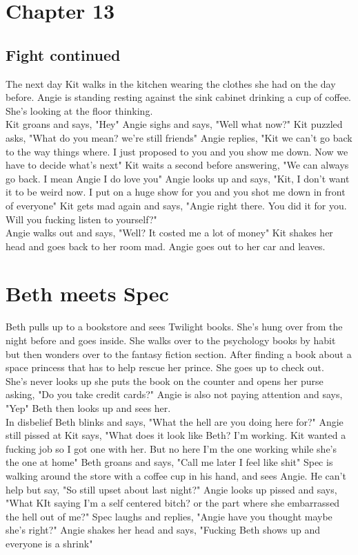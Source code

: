 \documentclass{article}[12px] %
\begin{document}
\section* {Chapter 13}        %
\subsection* {Fight continued}%
The next day Kit walks in the kitchen wearing the clothes she had on the day before. Angie is standing resting against the sink cabinet drinking a cup of coffee. She's looking at the floor thinking.\\

Kit groans and says, "Hey" Angie sighs and says, "Well what now?" Kit puzzled asks, "What do you mean? we're still friends" Angie replies, "Kit we can't go back to the way things where. I just proposed to you and you show me down. Now we have to decide what's next" Kit waits a second before answering, "We can always go back. I mean Angie I do love you" Angie looks up and says, "Kit, I don't want it to be weird now. I put on a huge show for you and you shot me down in front of everyone" Kit gets mad again and says, "Angie right there. You did it for you. Will you fucking listen to yourself?" \\

Angie walks out and says, "Well? It costed me a lot of money" Kit shakes her head and goes back to her room mad. Angie goes out to her car and leaves.\\

\section {Beth meets Spec}
Beth pulls up to a bookstore and sees Twilight books. She's hung over from the night before and goes inside. She walks over to the psychology books by habit but then wonders over to the fantasy fiction section.  After finding a book about a space princess that has to help rescue her prince. She goes up to check out.\\

She's never looks up she puts the book on the counter and opens her purse asking, "Do you take credit cards?" Angie is also not paying attention and says, "Yep" Beth then looks up and sees her.\\

In disbelief Beth blinks and says, "What the hell are you doing here for?" Angie still pissed at Kit says, "What does it look like Beth? I'm working. Kit wanted a fucking job so I got one with her. But no here I'm the one working while she's the one at home" Beth groans and says, "Call me later I feel like shit" Spec is walking around the store with a coffee cup in his hand, and sees Angie. He can't help but say, "So still upset about last night?" Angie looks up pissed and says, "What KIt saying I'm a self centered bitch? or the part where she embarrassed the hell out of me?" Spec laughs and replies, "Angie have you thought maybe she's right?" Angie shakes her head and says, "Fucking Beth shows up and everyone is a shrink"\\
\end{document}
